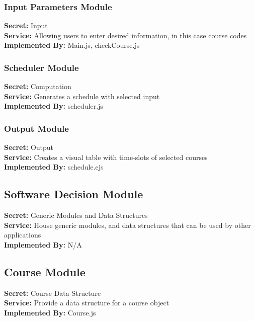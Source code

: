 \documentclass[11pt, oneside]{article}
\begin{document}
\subsubsection{Input Parameters Module}
\textbf{Secret:} Input \\
\textbf{Service:} Allowing users to enter desired information, in this case course codes \\
\textbf{Implemented By:}  Main.js, checkCourse.js \\

\subsubsection{Scheduler Module}
\textbf{Secret:} Computation \\
\textbf{Service:} Generates a schedule with selected input \\
\textbf{Implemented By:} scheduler.js \\

\subsubsection{Output Module}
\textbf{Secret:} Output \\
\textbf{Service:} Creates a visual table with time-slots of selected courses \\
\textbf{Implemented By:} schedule.ejs \\

\subsection{Software Decision Module}
\textbf{Secret:} Generic Modules and Data Structures\\
\textbf{Service:} House generic modules, and data structures that can be used by other applications \\
\textbf{Implemented By:} N/A \\

\subsection{Course Module}
\textbf{Secret:} Course Data Structure \\
\textbf{Service:} Provide a data structure for a course object \\
\textbf{Implemented By:} Course.js \\


\newpage
\end{document}
